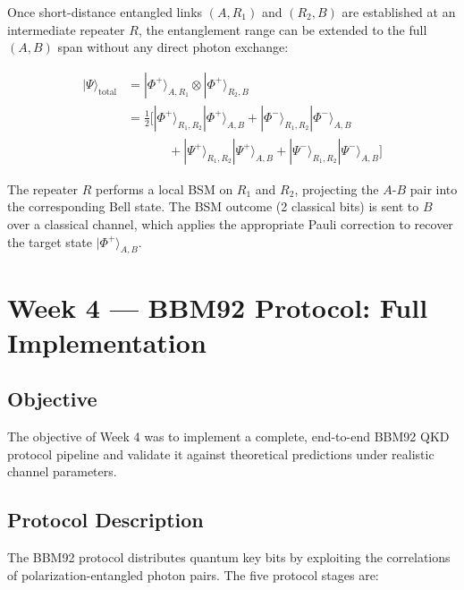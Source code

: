 \documentclass[12pt,oneside,letterpaper,english]{article}
\begin{document}
Once short-distance entangled links $(A, R_1)$ and $(R_2, B)$ are established at an intermediate repeater $R$, the entanglement range can be extended to the full $(A, B)$ span without any direct photon exchange:

\begin{equation}
\begin{split}
    |\Psi\rangle_{\text{total}} &= |\Phi^+\rangle_{A,R_1} \otimes |\Phi^+\rangle_{R_2,B} \\
    &= \frac{1}{2}\Big[
        |\Phi^+\rangle_{R_1,R_2}|\Phi^+\rangle_{A,B}
        + |\Phi^-\rangle_{R_1,R_2}|\Phi^-\rangle_{A,B} \\
    &\quad\quad\quad\;
        + |\Psi^+\rangle_{R_1,R_2}|\Psi^+\rangle_{A,B}
        + |\Psi^-\rangle_{R_1,R_2}|\Psi^-\rangle_{A,B}
    \Big]
\end{split}
    \label{eq:swapping}
\end{equation}

The repeater $R$ performs a local BSM on $R_1$ and $R_2$, projecting the $A$-$B$ pair into the corresponding Bell state. The BSM outcome (2 classical bits) is sent to $B$ over a classical channel, which applies the appropriate Pauli correction to recover the target state $|\Phi^+\rangle_{A,B}$.

\section{Week 4 --- BBM92 Protocol: Full Implementation}

\subsection{Objective}

The objective of Week 4 was to implement a complete, end-to-end BBM92 QKD protocol pipeline and validate it against theoretical predictions under realistic channel parameters.

\subsection{Protocol Description}

The BBM92 protocol \cite{BBM92Paper} distributes quantum key bits by exploiting the correlations of polarization-entangled photon pairs. The five protocol stages are:
\end{document}
